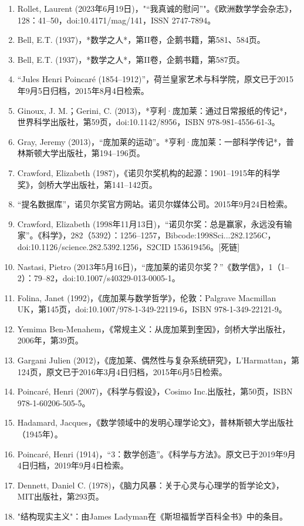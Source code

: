 \begin{enumerate}
\item Rollet, Laurent (2023年6月19日)，"“我真诚的慰问”"。《欧洲数学学会杂志》，128：41–50，doi:10.4171/mag/141，ISSN 2747-7894。
\item Bell, E.T. (1937)，*数学之人*，第II卷，企鹅书籍，第581、584页。
\item Bell, E.T. (1937)，*数学之人*，第II卷，企鹅书籍，第587页。
\item “Jules Henri Poincaré (1854–1912)”，荷兰皇家艺术与科学院，原文已于2015年9月5日归档，2015年8月4日检索。
\item Ginoux, J. M.；Gerini, C. (2013)，*亨利·庞加莱：通过日常报纸的传记*，世界科学出版社，第59页，doi:10.1142/8956，ISBN 978-981-4556-61-3。
\item Gray, Jeremy (2013)，“庞加莱的运动”。*亨利·庞加莱：一部科学传记*，普林斯顿大学出版社，第194–196页。
\item Crawford, Elizabeth (1987)，《诺贝尔奖机构的起源：1901–1915年的科学奖》，剑桥大学出版社，第141–142页。
\item “提名数据库”，诺贝尔奖官方网站。诺贝尔媒体公司。2015年9月24日检索。
\item Crawford, Elizabeth (1998年11月13日)，“诺贝尔奖：总是赢家，永远没有输家”。《科学》，282（5392）：1256–1257，Bibcode:1998Sci...282.1256C，doi:10.1126/science.282.5392.1256，S2CID 153619456。[死链]
\item Nastasi, Pietro (2013年5月16日)，“庞加莱的诺贝尔奖？”《数学信》，1（1–2）：79–82，doi:10.1007/s40329-013-0005-1。
\item Folina, Janet (1992)，《庞加莱与数学哲学》，伦敦：Palgrave Macmillan UK，第145页，doi:10.1007/978-1-349-22119-6，ISBN 978-1-349-22121-9。
\item Yemima Ben-Menahem，《常规主义：从庞加莱到奎因》，剑桥大学出版社，2006年，第39页。
\item Gargani Julien (2012)，《庞加莱、偶然性与复杂系统研究》，L'Harmattan，第124页，原文已于2016年3月4日归档，2015年6月5日检索。
\item Poincaré, Henri (2007)，《科学与假设》，Cosimo Inc.出版社，第50页，ISBN 978-1-60206-505-5。
\item Hadamard, Jacques，《数学领域中的发明心理学论文》，普林斯顿大学出版社（1945年）。
\item Poincaré, Henri (1914)，“3：数学创造”。《科学与方法》。原文已于2019年9月4日归档，2019年9月4日检索。
\item Dennett, Daniel C. (1978)，《脑力风暴：关于心灵与心理学的哲学论文》，MIT出版社，第293页。
\item "结构现实主义"：由James Ladyman在《斯坦福哲学百科全书》中的条目。
\end{enumerate}
